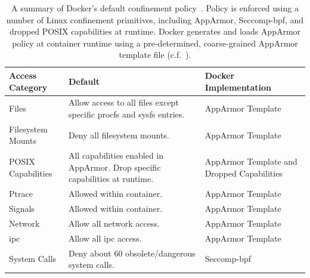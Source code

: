 \documentclass[
  fontsize=12pt,
  titlepage=firstiscover,
  paper=letter,
oneside,
  cleardoublepage=plain,
  parskip=half-,
  DIV=10,
  parindent,
  appendixprefix,
  chapterprefix,
  listof=totoc,
]{scrbook}
\begin{document}
\begin{table}[htpb]
  \centering
  \caption[The default Docker confinement policy]{
    A summary of Docker's default confinement policy~\cite{docker_security,
    docker_apparmor, docker_default_apparmor}. Policy is enforced using a number of Linux
    confinement primitives, including AppArmor, Seccomp-bpf, and dropped POSIX
    capabilities at runtime. Docker generates and loads AppArmor policy at container
    runtime using a pre-determined, coarse-grained AppArmor template file
    (c.f.\ ).
  }\label{tab:docker-default}
  \footnotesize
  \begin{tabular}{lp{2in}p{1.6in}}
  \toprule
  Access Category & Default & Docker Implementation \\
  \midrule
  Files & Allow access to all files except specific procfs and sysfs entries. & AppArmor Template \\
  Filesystem Mounts & Deny all filesystem mounts. & AppArmor Template \\
  POSIX Capabilities & All capabilities enabled in AppArmor.  Drop specific capabilities at runtime. & AppArmor Template and Dropped Capabilities \\
  Ptrace & Allowed within container. & AppArmor Template \\
  Signals & Allowed within container. & AppArmor Template \\
  Network & Allow all network access. & AppArmor Template \\
  \gls{ipc} & Allow all \gls{ipc} access. & AppArmor Template \\
  System Calls & Deny about 60 obsolete/dangerous system calls. & Seccomp-bpf \\
  \bottomrule
  \end{tabular}
\end{table}
\end{document}
